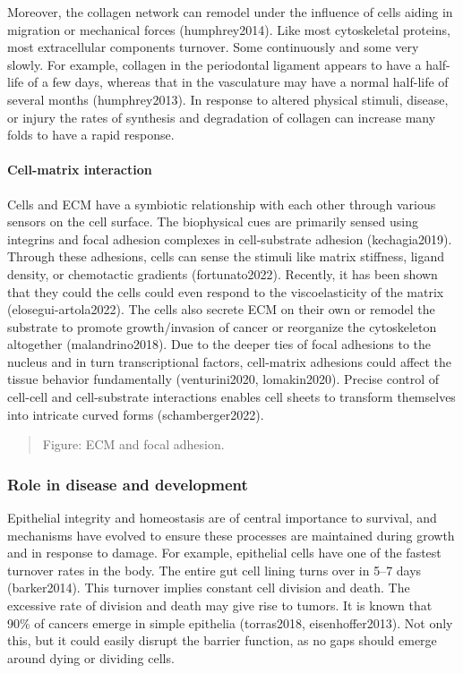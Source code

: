 \documentclass[
]{article}
\begin{document}
Moreover, the collagen network can remodel under the influence of cells
aiding in migration or mechanical forces (humphrey2014). Like most
cytoskeletal proteins, most extracellular components turnover. Some
continuously and some very slowly. For example, collagen in the
periodontal ligament appears to have a half-life of a few days, whereas
that in the vasculature may have a normal half-life of several months
(humphrey2013). In response to altered physical stimuli, disease, or
injury the rates of synthesis and degradation of collagen can increase
many folds to have a rapid response.

\hypertarget{cell-matrix-interaction}{%
\paragraph{Cell-matrix interaction}\label{cell-matrix-interaction}}

Cells and ECM have a symbiotic relationship with each other through
various sensors on the cell surface. The biophysical cues are primarily
sensed using integrins and focal adhesion complexes in cell-substrate
adhesion (kechagia2019). Through these adhesions, cells can sense the
stimuli like matrix stiffness, ligand density, or chemotactic gradients
(fortunato2022). Recently, it has been shown that they could the cells
could even respond to the viscoelasticity of the matrix
(elosegui-artola2022). The cells also secrete ECM on their own or
remodel the substrate to promote growth/invasion of cancer or reorganize
the cytoskeleton altogether (malandrino2018). Due to the deeper ties of
focal adhesions to the nucleus and in turn transcriptional factors,
cell-matrix adhesions could affect the tissue behavior fundamentally
(venturini2020, lomakin2020). Precise control of cell-cell and
cell-substrate interactions enables cell sheets to transform themselves
into intricate curved forms (schamberger2022).

\begin{quote}
Figure: ECM and focal adhesion.
\end{quote}

\hypertarget{role-in-disease-and-development}{%
\subsubsection{Role in disease and
development}\label{role-in-disease-and-development}}

Epithelial integrity and homeostasis are of central importance to
survival, and mechanisms have evolved to ensure these processes are
maintained during growth and in response to damage. For example,
epithelial cells have one of the fastest turnover rates in the body. The
entire gut cell lining turns over in 5--7 days (barker2014). This
turnover implies constant cell division and death. The excessive rate of
division and death may give rise to tumors. It is known that 90\% of
cancers emerge in simple epithelia (torras2018, eisenhoffer2013). Not
only this, but it could easily disrupt the barrier function, as no gaps
should emerge around dying or dividing cells.
\end{document}
